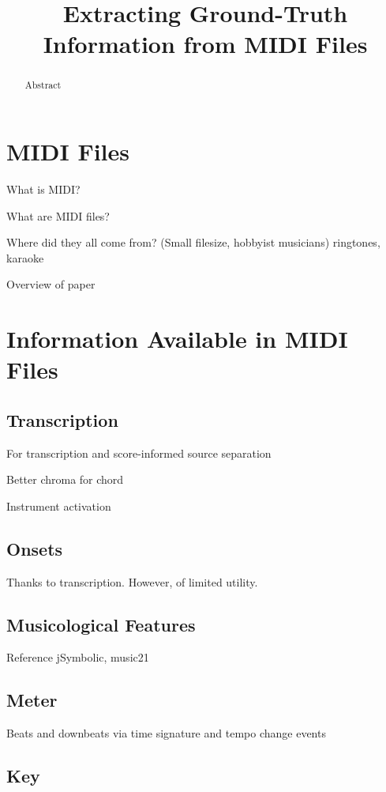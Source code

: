 \documentclass{article}
\title{Extracting Ground-Truth Information from MIDI Files}
\begin{document}
\maketitle

\begin{abstract}
Abstract
\end{abstract}

\section{MIDI Files}\label{sec:introduction}

What is MIDI?

What are MIDI files?

Where did they all come from? (Small filesize, hobbyist musicians) ringtones, karaoke

Overview of paper

\section{Information Available in MIDI Files}

\subsection{Transcription}

For transcription and score-informed source separation

Better chroma for chord

Instrument activation

\subsection{Onsets}

Thanks to transcription.  However, of limited utility.

\subsection{Musicological Features}

Reference jSymbolic, music21

\subsection{Meter}

Beats and downbeats via time signature and tempo change events

\subsection{Key}
\end{document}
